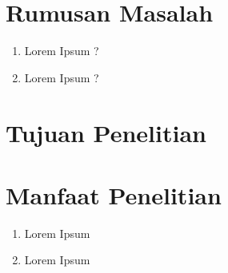 \documentclass[12pt,oneside]{udthesis}\usepackage[]{graphicx}\usepackage[]{color}
\begin{document}
\section{Rumusan Masalah}
\lipsum[2-4]

\begin{enumerate}
    \item  Lorem Ipsum ?
    \item Lorem Ipsum ?
\end{enumerate}


\section{Tujuan Penelitian}
\lipsum[2-4]
\section{Manfaat Penelitian}

\lipsum[2-4]
\begin{enumerate}
\item Lorem Ipsum
\item Lorem Ipsum
\end{enumerate}
\end{document}
